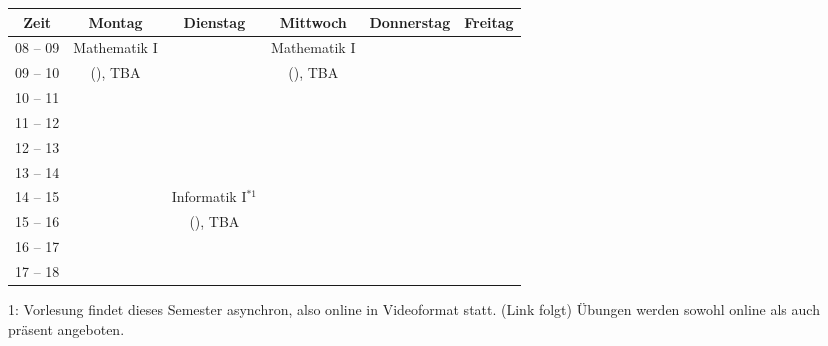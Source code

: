 \begin{minipage}{\textwidth}
    \footnotesize
\begin{center}
	\begin{tabular}{|c|c|c|c|c|c|}
	\hline
	 Zeit     &    Montag                    & Dienstag          & Mittwoch          & Donnerstag & Freitag \\ \hline\hline
	 08 -- 09 &    Mathematik I              &                   & Mathematik I      &  &  \\ \cline{1-1} \cline{3-3} \cline{5-6} 
	 09 -- 10 &    (\Matheprof), TBA         &                   & (\Matheprof), TBA &  &  \\ \hline
	 10 -- 11 &                              &                   &                   &  &  \\ \cline{1-1} \cline{3-6} 
	 11 -- 12 &                              &                   &                   &  &  \\ \hline
	 12 -- 13 &                              &                   &                   &  &  \\ \hline
	 13 -- 14 &                              &                   &                   &  &  \\ \hline
	 14 -- 15 &                              & Informatik I$^{*1}$  &                   &  &  \\ \cline{1-2} \cline{4-6} 
	 15 -- 16 &                              & (\Infoprof), TBA  &                   &  &  \\ \hline
	 16 -- 17 &                              &                   &                   &  &  \\ \hline
	 17 -- 18 &                              &                   &                   &  &  \\ \hline 
	\end{tabular}

1: Vorlesung findet dieses Semester asynchron, also online in Videoformat statt. (Link folgt) Übungen werden sowohl online als auch präsent angeboten.\\

\end{center}
\end{minipage}

